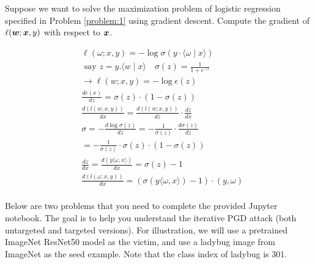 \documentclass[11pt]{article}
\begin{document}
\directions{\clearpage}



\begin{problem}[10 pts]
\label{problem:2}
\rm
Suppose we want to solve the maximization problem of logistic regression specified in Problem \ref{problem:1} using gradient descent. Compute the gradient of $\ell(\bm{w}; \bm{x}, y)$ with respect to $\bm{x}$.
\end{problem}

$$
\begin{aligned}
& \ell(\omega ; x, y)=-\log \sigma(y \cdot\langle\omega \mid x\rangle) \\
& \text { say } z=y .\langle w \mid x\rangle \quad \sigma(z)=\frac{1}{1+e^{-z}} \\
& \rightarrow \ell(w ; x, y)=-\log \epsilon(z) \\
& \frac{d c(x)}{d z}=\sigma(z) \cdot(1-\sigma(z)) \\
& \frac{d(l(w, x, y))}{d x}=\frac{d(l(w ; x, y))}{d z} \cdot \frac{d z}{d x} \\
& \sigma=-\frac{d \log \sigma(z)}{d z}=-\frac{1}{\sigma(z)} \cdot \frac{d \sigma(z)}{d z} \\
& =-\frac{1}{\sigma(z)} \cdot \sigma(z) \cdot(1-\sigma(z)) \\
& \frac{d z}{d x}=\frac{d(y\langle\omega, x\rangle)}{d x}=\sigma(z)-1 \\
& \frac{d(l(\omega ; x, y))}{d x}=(\sigma(y\langle\omega, x\rangle)-1) \cdot(y, \omega) \\
&
\end{aligned}
$$
\directions{\clearpage}

 Below are two problems that you need to complete the provided Jupyter notebook. The goal is to help you understand the iterative PGD attack (both untargeted and targeted versions). For illustration, we will use a pretrained ImageNet ResNet50 model as the victim, and use a ladybug image from ImageNet as the seed example. Note that the class index of ladybug is 301.

\end{document}
